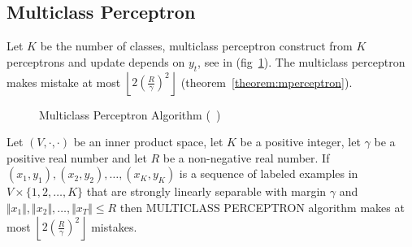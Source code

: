 \subsection{Multiclass Perceptron}
Let $K$ be the number of classes, multiclass perceptron construct from $K$ perceptrons
and update depends on $y_t$, see in (fig~\ref{fig:alg-mperceptron}). 
The multiclass perceptron makes mistake at most $\left\lfloor 2\left( \frac{R}{\gamma} \right)^2\right\rfloor$ (theorem~\ref{theorem:mperceptron}).
\begin{figure}[hbt!]
  \begin{algorithm}[H]
    \SetAlgoLined
    \DontPrintSemicolon
  \end{algorithm}
  \caption{Multiclass Perceptron Algorithm (~\cite{CrammerS2003-ultraconservative})}
  \label{fig:alg-mperceptron}
\end{figure}

\begin{theorem}
\label{theorem:mperceptron}
Let $(V,\cdot,\cdot)$ be an inner product space, let $K$ be a
positive integer, let $\gamma$ be a positive real number and let $R$ be a non-negative real number. If $(x_1,y_1),(x_2,y_2),\dots,(x_K,y_K)$
is a sequence of labeled examples in $V\times\{1,2,\dots,K\}$ that are strongly linearly separable with margin $\gamma$ and
$\Vert x_1\Vert ,\Vert x_2\Vert ,\dots,\Vert x_T \Vert\leq R$ then MULTICLASS PERCEPTRON algorithm makes at most $\left\lfloor 2\left( \frac{R}{\gamma} \right)^2\right\rfloor$ mistakes.
\end{theorem}


